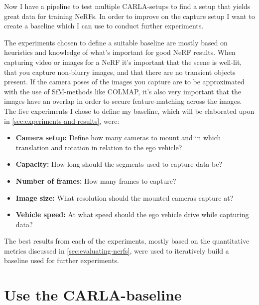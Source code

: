 Now I have a pipeline to test multiple CARLA-setups to find a setup that yields great data for training NeRFs. In order to improve on the capture setup I want to create a baseline which I can use to conduct further experiments.

The experiments chosen to define a suitable baseline are mostly based on heuristics and knowledge of what's important for good NeRF results. When capturing video or images for a NeRF it’s important that the scene is well-lit, that you capture non-blurry images, and that there are no transient objects present. If the camera poses of the images you capture are to be approximated with the use of SfM-methods like COLMAP, it's also very important that the images have an overlap in order to secure feature-matching across the images. The five experiments I chose to define my baseline, which will be elaborated upon in \autoref{sec:experiments-and-results}, were:

\begin{itemize}
    \item \textbf{Camera setup:} Define how many cameras to mount and in which translation and rotation in relation to the ego vehicle?
    \item \textbf{Capacity:} How long should the segments used to capture data be?
    \item \textbf{Number of frames:} How many frames to capture?
    \item \textbf{Image size:} What resolution should the mounted cameras capture at?
    \item \textbf{Vehicle speed:} At what speed should the ego vehicle drive while capturing data?
\end{itemize}

The best results from each of the experiments, mostly based on the quantitative metrics discussed in \autoref{sec:evaluating-nerfs}, were used to iteratively build a baseline used for further experiments.
















\section{Use the CARLA-baseline}
\begin{comment}
Premise: Have a CARLA-baseline for further experiments
Question: Which further experiments should I conduct?

\begin{itemize}
    \item Find the efficiency of pose refinement
\end{itemize}
\end{comment}

